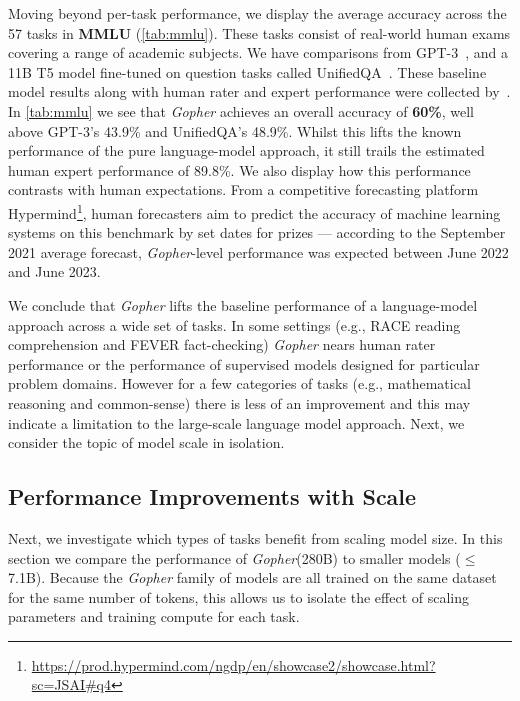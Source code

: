 \documentclass[11pt, a4paper, logo, internal, copyright, nonumbering]{deepmind}
\newcommand{\gopher}{\textit{Gopher}\xspace}
\begin{document}
Moving beyond per-task performance, we display the average accuracy across the 57 tasks in \textbf{MMLU} (\autoref{tab:mmlu}). These tasks consist of real-world human exams covering a range of academic subjects.
We have comparisons from GPT-3~\citep{gpt3}, and a 11B T5 model fine-tuned on question tasks called UnifiedQA~\citep{khashabi2020unifiedqa}. These baseline model results along with human rater and expert performance were collected by~\citet{hendrycks2020measuring}. In \autoref{tab:mmlu} we see that \gopher achieves an overall accuracy of \textbf{60\%}, well above GPT-3's 43.9\% and UnifiedQA's 48.9\%.
Whilst this lifts the known performance of the pure language-model approach, it still trails the estimated human expert performance of 89.8\%. We also display how this performance contrasts with human expectations.
From a competitive forecasting platform Hypermind\footnote{\url{https://prod.hypermind.com/ngdp/en/showcase2/showcase.html?sc=JSAI\#q4}}, human forecasters aim to predict the accuracy of machine learning systems on this benchmark by set dates for prizes --- according to the September 2021 average forecast, \gopher-level performance was expected between June 2022 and June 2023.

We conclude that \gopher lifts the baseline performance of a language-model approach across a wide set of tasks. In some settings (e.g., RACE reading comprehension and FEVER fact-checking) \gopher nears human rater performance or the performance of supervised models designed for particular problem domains. However for a few categories of tasks (e.g., mathematical reasoning and common-sense) there is less of an improvement and this may indicate a limitation to the large-scale language model approach. Next, we consider the topic of model scale in isolation.

\subsection{Performance Improvements with Scale}
Next, we investigate which types of tasks benefit from scaling model size. In this section we compare the performance of \gopher (280B) to smaller models ($\leq$ 7.1B). Because the \gopher family of models are all trained on the same dataset for the same number of tokens, this allows us to isolate the effect of scaling parameters and training compute for each task.   
\end{document}
